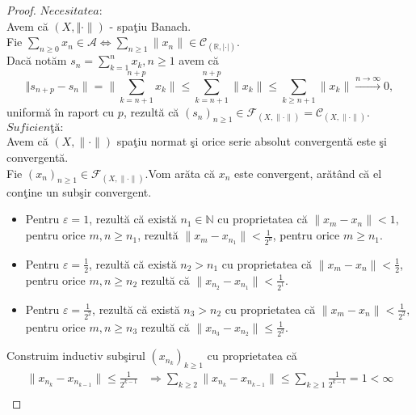 \documentclass[ a4paper, 12pt]{report}
\theoremstyle{definition}
\theoremstyle{remark}
\numberwithin{equation}{section}
\begin{document}
\begin{proof}
$\textit{Necesitatea:}$ \\
Avem c\u a  $(X, \Vert \cdot \rVert)$ - spa\c tiu Banach.\\
Fie $\sum\limits_{n \geq 0} x_n \in \mathcal{A} \Leftrightarrow \sum\limits_{n \geq 1} \lVert x_n \rVert \in \mathcal{C}_{(\mathbb{R},\lvert \cdot \rvert)} .$\\
Dac\u a not\u am $s_n = \sum\limits_{k=1}^{n} x_k, n \geq 1$ avem c\u a
$$ \Vert s_{n+p} - s_n \rVert =\lVert \sum\limits_{k=n+1}^{n+p} x_k \rVert
\leq  \sum\limits_{k=n+1}^{n+p} \lVert x_k \rVert \leq \sum\limits_{k \geq n+1} \lVert x_k \rVert \stackrel{n \rightarrow \infty}{\longrightarrow}0,$$ uniform\u a \^in raport cu $p$, rezult\u a c\u a $(s_n)_{n \geq 1} \in \mathcal{F}_{(X,\lVert \cdot \rVert)} = \mathcal{C}_{(X, \lVert  \cdot\rVert)}.$\\
$\textit{Suficien\c t\u a:}$\\
Avem c\u a $(X,\lVert \cdot \rVert)$ spa\c tiu normat \c si  orice serie absolut convergent\u a este \c si convergent\u a.\\
Fie $(x_n)_{n \geq 1} \in \mathcal{F}_{(X, \lVert \cdot \rVert)}.$Vom ar\u ata c\u a $x_n$ este convergent, ar\u at\^and c\u a el con\c tine un sub\c sir convergent.\\
\begin{itemize}
\item Pentru $\varepsilon\!=\!1$, rezult\u a c\u a exist\u a $n_1 \in \mathbb{N}$ cu proprietatea c\u a $\lVert x_m - x_n \rVert < 1,$ pentru orice $m,n \geq n_1$, rezult\u a $\lVert x_m-x_{n_1}\rVert<\frac{1}{2^0}$, pentru orice  $m \geq n_1$.
\item Pentru $\varepsilon\!\!=\!\!\frac{1}{2}$,  rezult\u a c\u a exist\u a $n_2 > n_1$ cu proprietatea c\u a $\lVert x_m - x_n \rVert < \frac{1}{2}$, pentru orice $m,n \geq n_2$ rezult\u a c\u  a $\lVert x_{n_2}-x_{n_1}\rVert<\frac{1}{2^1}$.
\item Pentru $\varepsilon\!\!=\!\!\frac{1}{2^2}$,  rezult\u a c\u a exist\u a $n_3\!\!>\!\!n_2$ cu proprietatea c\u a $\lVert x_m - x_n \rVert < \frac{1}{2^2},$ pentru orice $m,n \geq n_3$ rezult\u a c\u a $\lVert x_{n_3}-x_{n_2}\rVert \leq \frac{1}{2^2}$.
\end{itemize}
Construim inductiv sub\c sirul $(x_{n_k})_{k \geq 1}$ cu proprietatea c\u a
 \begin{align*}
 \lVert x_{n_k} - x_{n_{k-1}} \rVert \leq \frac{1}{2^{k-1}} &\Rightarrow \sum\limits_{k \geq 2} \lVert x_{n_k} - x_{n_{k-1}} \rVert \leq \sum\limits_{k \geq 1}\frac{1}{2^{k-1}} = 1 < \infty \\

\end{align*}
\end{proof}
\end{document}
